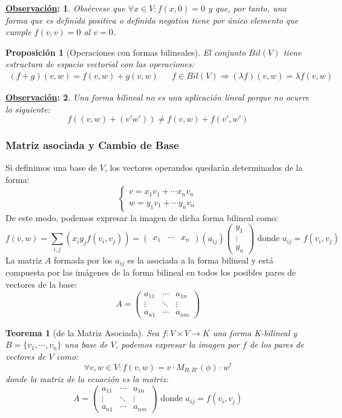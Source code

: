 \documentclass[10pt,a4paper,openright]{book}
\theoremstyle{break}
\newtheorem*{theo}{Teorema}
\newtheorem*{prop}{Proposición}
\newtheorem*{obs}{\underline{Observación}:}
\begin{document}
\begin{obs}
Obsérvese que $\forall x \in V: f(x,0) = 0$ y que, por tanto, una forma que es definida positiva o definida negativa tiene por único elemento que cumple $f(v,v) = 0$ al $v=0$.
\end{obs}

\begin{prop}[Operaciones con formas bilineales]
El conjunto $Bil(V)$ tiene estructura de espacio vectorial con las operaciones:
\begin{align*}
(f+g)(v,w)=f(v,w)+g(v,w) & & f\in Bil(V)\Rightarrow (\lambda f)(v,w)=\lambda f(v,w)
\end{align*}
\end{prop}

\begin{obs}
Una forma bilineal no es una aplicación lineal porque no ocurre lo siguiente:
$$f((v,w)+(v'w'))\neq f(v,w)+f(v',w')$$
\end{obs}

\subsubsection{Matriz asociada y Cambio de Base}
Si definimos una base de $V$, los vectores operandos quedarán determinados de la forma:
$$\begin{cases}v=x_1v_1+\cdots x_nv_n \\ w=y_1v_1+\cdots y_nv_n\end{cases}$$
De este modo, podemos expresar la imagen de dicha forma bilineal como:
$$f(v,w)=\sum_{i,j} (x_iy_jf(v_i,v_j)) = \begin{pmatrix} x_1 & \cdots & x_n\end{pmatrix}(a_{ij})\begin{pmatrix} y_1 \\ \vdots \\ y_n \end{pmatrix} \mbox{ donde }a_{ij} = f(v_i, v_j)$$
La matriz $A$ formada por los $a_{ij}$ es la asociada a la forma bilineal y está compuesta por las imágenes de la forma bilineal en todos los posibles pares de vectores de la base:
$$A=\begin{pmatrix} a_{11} & \cdots & a_{1n} \\ \vdots & \ddots & \vdots \\ a_{n1} & \cdots & a_{nm} \end{pmatrix}$$

\begin{theo}[de la Matriz Asociada]
Sea $f: V\times V \longrightarrow K$ una forma K-bilineal y $B=\{v_1,\cdots, v_n\}$ una base de $V$, podemos expresar la imagen por $f$ de los pares de vectores de $V$ como:
$$\forall v, w\in V : f(v,w) = v\cdot M_{B,B'}(\phi) \cdot w^t$$
donde la matriz de la ecuación es la matriz:
$$A=\begin{pmatrix} a_{11} & \cdots & a_{1n} \\ \vdots & \ddots & \vdots \\ a_{n1} & \cdots & a_{nm} \end{pmatrix} \mbox{ donde } a_{ij} = f(v_i, v_j)$$
\end{theo}
\end{document}
